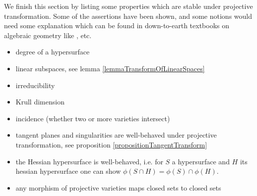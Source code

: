 We finish this section by listing some properties which are stable under projective transformation.
Some of the assertions have been shown, and some notions would need some explanation which can be found in down-to-earth textbooks on algebraic geometry like \cite{shafarevich1994basic, harris1992algebraic, brieskorn2012plane}, etc.
\begin{itemize}
\item degree of a hypersurface
\item linear subspaces, see lemma \ref{lemmaTransformOfLinearSpaces}
\item irreducibility
\item Krull dimension
\item incidence (whether two or more varieties intersect)
\item tangent planes and singularities are well-behaved under projective transformation, see proposition \ref{propositionTangentTransform}
\item the Hessian hypersurface is well-behaved, i.e. for $S$ a hypersurface and $H$ its hessian hypersurface one can show $\phi(S \cap H) = \phi(S) \cap \phi(H)$.
\item any morphism of projective varieties maps closed sets to closed sets \cite[theorem 1.10]{shafarevich1994basic}
\end{itemize}

